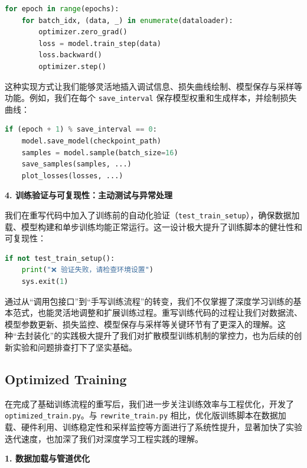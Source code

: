 \documentclass{ctexart}
\begin{document}
\begin{lstlisting}[language=python]
for epoch in range(epochs):
    for batch_idx, (data, _) in enumerate(dataloader):
        optimizer.zero_grad()
        loss = model.train_step(data)
        loss.backward()
        optimizer.step()
\end{lstlisting}

\noindent
这种实现方式让我们能够灵活地插入调试信息、损失曲线绘制、模型保存与采样等功能。例如，我们在每个 \texttt{save\_interval} 保存模型权重和生成样本，并绘制损失曲线：

\begin{lstlisting}[language=python]
if (epoch + 1) % save_interval == 0:
    model.save_model(checkpoint_path)
    samples = model.sample(batch_size=16)
    save_samples(samples, ...)
    plot_losses(losses, ...)
\end{lstlisting}

\vspace{0.5em}
\noindent
\textbf{4. 训练验证与可复现性：主动测试与异常处理}

\noindent
我们在重写代码中加入了训练前的自动化验证（\texttt{test\_train\_setup}），确保数据加载、模型构建和单步训练均能正常运行。这一设计极大提升了训练脚本的健壮性和可复现性：

\begin{lstlisting}[language=python]
if not test_train_setup():
    print("❌ 验证失败，请检查环境设置")
    sys.exit(1)
\end{lstlisting}

\vspace{0.5em}

\noindent
通过从“调用包接口”到“手写训练流程”的转变，我们不仅掌握了深度学习训练的基本范式，也能灵活地调整和扩展训练过程。重写训练代码的过程让我们对数据流、模型参数更新、损失监控、模型保存与采样等关键环节有了更深入的理解。这种“去封装化”的实践极大提升了我们对扩散模型训练机制的掌控力，也为后续的创新实验和问题排查打下了坚实基础。


\subsection{Optimized Training}
\noindent
在完成了基础训练流程的重写后，我们进一步关注训练效率与工程优化，开发了 \texttt{optimized\_train.py}。与 \texttt{rewrite\_train.py} 相比，优化版训练脚本在数据加载、硬件利用、训练稳定性和采样监控等方面进行了系统性提升，显著加快了实验迭代速度，也加深了我们对深度学习工程实践的理解。

\vspace{0.5em}
\noindent
\textbf{1. 数据加载与管道优化}
\end{document}

